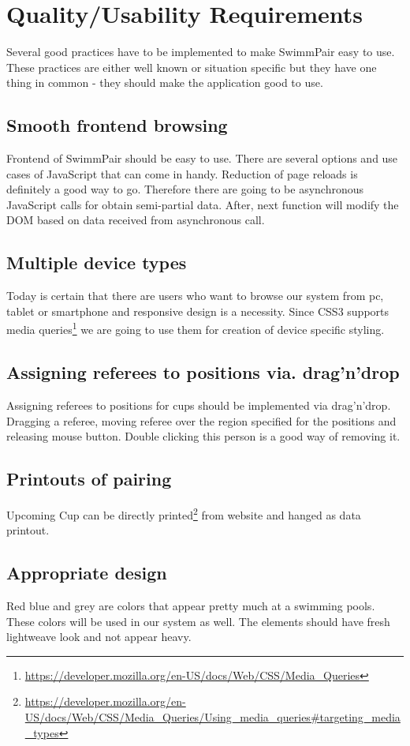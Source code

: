 \section{Quality/Usability Requirements}
Several good practices have to be implemented to make SwimmPair easy to use. These practices are either well known or situation specific but they have one thing in common - they should make the application good to use.
\subsection*{Smooth frontend browsing}
\par
Frontend of SwimmPair should be easy to use. There are several options and use cases of JavaScript that can come in handy. Reduction of page reloads is definitely a good way to go. Therefore there are going to be asynchronous JavaScript calls for obtain semi-partial data. After, next function will modify the DOM based on data received from asynchronous call. 
\subsection*{Multiple device types}
\par
Today is certain that there are users who want to browse our system from pc, tablet or smartphone and responsive design is a necessity. Since CSS3 supports media queries\footnote{\url{https://developer.mozilla.org/en-US/docs/Web/CSS/Media_Queries}} we are going to use them for creation of device specific styling.
\subsection*{Assigning referees to positions via. drag'n'drop}
\par
Assigning referees to positions for cups should be implemented via drag'n'drop. Dragging a referee, moving referee over the region specified for the positions and releasing mouse button. Double clicking this person is a good way of removing it.
\subsection*{Printouts of pairing}
Upcoming Cup can be directly printed\footnote{\url{https://developer.mozilla.org/en-US/docs/Web/CSS/Media_Queries/Using_media_queries\#targeting_media_types}} from website and hanged as data printout. 
\subsection*{Appropriate design}
\par
Red blue and grey are colors that appear pretty much at a swimming pools. These colors will be used in our system as well. The elements should have fresh lightweave look and not appear heavy.
